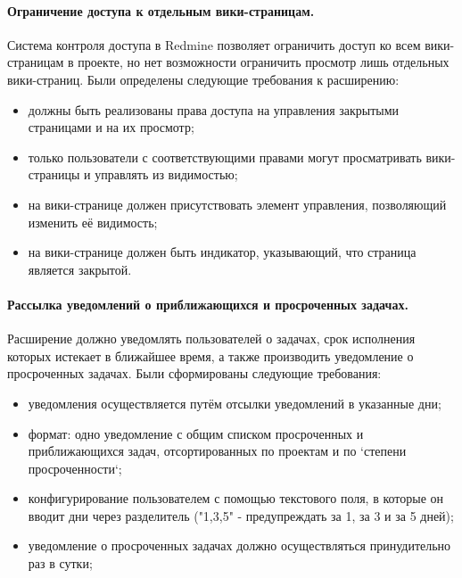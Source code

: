 \paragraph{Ограничение доступа к отдельным вики-страницам.}
\label{definition:private_wiki}
Система контроля доступа в Redmine позволяет ограничить доступ ко всем
вики-страницам в проекте, но нет возможности ограничить просмотр лишь отдельных
вики-страниц. Были определены следующие требования к расширению:
\begin{itemize}
  \item должны быть реализованы права доступа на управления закрытыми
  страницами и на их просмотр;
  \item только пользователи с соответствующими правами могут просматривать
  вики-страницы и управлять из видимостью;   
  \item на вики-странице должен присутствовать элемент управления, позволяющий
  изменить её видимость;
  \item на вики-странице должен быть индикатор, указывающий, что страница
  является закрытой.
\end{itemize}

\paragraph{Рассылка уведомлений о приближающихся и просроченных задачах.}
\label{definition:due_date_reminder}
Расширение должно уведомлять пользователей о задачах, срок исполнения которых
истекает в ближайшее время, а также производить уведомление о просроченных
задачах. Были сформированы следующие требования:
\begin{itemize}
  \item уведомления осуществляется путём отсылки уведомлений в указанные дни;
  \item формат: одно уведомление с общим списком просроченных и приближающихся
  задач, отсортированных по проектам и по `степени просроченности`; 
  \item конфигурирование пользователем с помощью текстового поля, в которые он
  вводит дни через разделитель ("1,3,5" - предупреждать за 1, за 3 и за 5
  дней);
  \item уведомление о просроченных задачах должно осуществляться принудительно
  раз в сутки;
\end{itemize}


